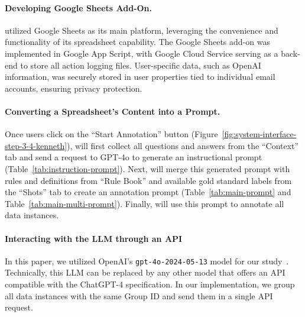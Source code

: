 

\paragraph{Developing Google Sheets Add-On.}
\sloppy
\system utilized Google Sheets as its main platform, leveraging the convenience and functionality of its spreadsheet capability. The Google Sheets add-on was implemented in Google App Script, with Google Cloud Service serving as a back-end to store all action logging files. User-specific data, such as OpenAI information, was securely stored in user properties tied to individual email accounts, ensuring privacy protection. 

\paragraph{Converting a Spreadsheet's Content into a Prompt.}
Once users click on the ``Start Annotation'' button (Figure~\ref{fig:system-interface-step-3-4-kenneth}), \system will first collect all questions and answers from the ``Context'' tab and send a request to GPT-4o to generate an instructional prompt (Table~\ref{tab:instruction-prompt}). Next, \system will merge this generated prompt with rules and definitions from ``Rule Book'' and available gold standard labels from the ``Shots'' tab to create an annotation prompt (Table~\ref{tab:main-prompt} and Table~\ref{tab:main-multi-prompt}). Finally, \system will use this prompt to annotate all data instances. 

\paragraph{Interacting with the LLM through an API}
In this paper, we utilized OpenAI's \texttt{gpt-4o-2024-05-13} model for our study~\cite{openai2024gpt4o}.
Technically, this LLM can be replaced by any other model that offers an API compatible with the ChatGPT-4 specification. 
In our implementation, we group all data instances with the same Group ID and send them in a single API request.








